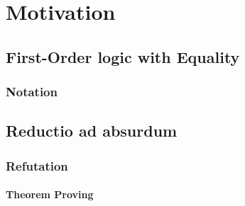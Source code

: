 
\section{Motivation}

\subsection{First-Order logic with Equality}

\begin{frame}
	\frametitle{Notation}
	
\end{frame}

\subsection{Reductio ad absurdum}

\begin{frame}
	\frametitle{Refutation}
	\framesubtitle{\FOL{}Theorem Proving}
	
\end{frame}

\begin{frame}
	
\end{frame}

\begin{frame}
	
	
\end{frame}

\begin{frame}
	
\end{frame}
	

